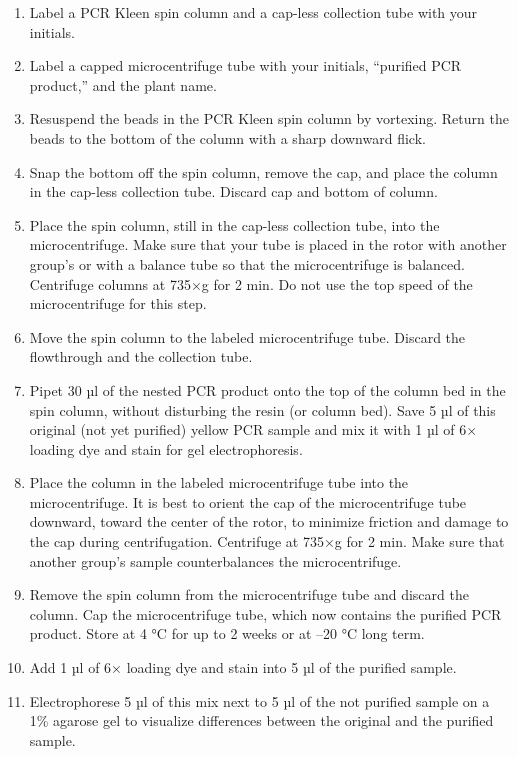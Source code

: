 \documentclass[]{book}
\providecommand{\tightlist}{%
  \setlength{\itemsep}{0pt}\setlength{\parskip}{0pt}}
\begin{document}
\begin{enumerate}
\def\labelenumi{\arabic{enumi}.}
\tightlist
\item
  Label a PCR Kleen spin column and a cap-less collection tube with your
  initials.
\item
  Label a capped microcentrifuge tube with your initials, ``purified PCR
  product,'' and the plant name.
\item
  Resuspend the beads in the PCR Kleen spin column by vortexing. Return
  the beads to the bottom of the column with a sharp downward flick.
\item
  Snap the bottom off the spin column, remove the cap, and place the
  column in the cap-less collection tube. Discard cap and bottom of
  column.
\item
  Place the spin column, still in the cap-less collection tube, into the
  microcentrifuge. Make sure that your tube is placed in the rotor with
  another group's or with a balance tube so that the microcentrifuge is
  balanced. Centrifuge columns at 735×g for 2 min. Do not use the top
  speed of the microcentrifuge for this step.
\item
  Move the spin column to the labeled microcentrifuge tube. Discard the
  flowthrough and the collection tube.
\item
  Pipet 30 µl of the nested PCR product onto the top of the column bed
  in the spin column, without disturbing the resin (or column bed). Save
  5 µl of this original (not yet purified) yellow PCR sample and mix it
  with 1 µl of 6× loading dye and stain for gel electrophoresis.
\item
  Place the column in the labeled microcentrifuge tube into the
  microcentrifuge. It is best to orient the cap of the microcentrifuge
  tube downward, toward the center of the rotor, to minimize friction
  and damage to the cap during centrifugation. Centrifuge at 735×g for 2
  min. Make sure that another group's sample counterbalances the
  microcentrifuge.
\item
  Remove the spin column from the microcentrifuge tube and discard the
  column. Cap the microcentrifuge tube, which now contains the purified
  PCR product. Store at 4 °C for up to 2 weeks or at --20 °C long term.
\item
  Add 1 µl of 6× loading dye and stain into 5 µl of the purified sample.
\item
  Electrophorese 5 µl of this mix next to 5 µl of the not purified
  sample on a 1\% agarose gel to visualize differences between the
  original and the purified sample.

\end{enumerate}
\end{document}
